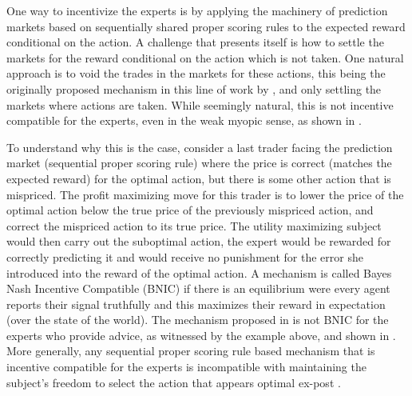 One way to incentivize the experts is by applying the machinery of prediction markets based on sequentially shared proper scoring rules to the expected reward conditional on the action.
A challenge that presents itself is how to settle the markets for the reward conditional on the action which is not taken.
One natural approach is to void the trades in the markets for these actions, this being the originally proposed mechanism in this line of work by \citet{hanson2002decision}, and only settling the markets where actions are taken.
While seemingly natural, this is not incentive compatible for the experts, even in the weak myopic sense, as shown in \citet{othman2010decision}. 

To understand why this is the case, consider a last trader facing the prediction market (sequential proper scoring rule)  where the  price is correct (matches the expected reward) for the optimal action, but there is some other action that is mispriced. The profit maximizing move for this trader is to lower the price of the optimal action below the true price of the previously mispriced action, and correct the mispriced action to its true  price. 
The utility maximizing subject would then carry out the suboptimal action, the expert would be rewarded for correctly predicting it and would receive no punishment for the error she introduced into the reward of the optimal action. 
A mechanism is called Bayes Nash Incentive Compatible (BNIC) if there is an equilibrium were every agent reports their signal truthfully and this maximizes their reward in expectation (over the state of the world).
The mechanism proposed in \citet{hanson2002decision} is not BNIC for the experts who provide advice, as witnessed by the example above, and shown in \citet{othman2010decision,chen2014eliciting}.
More generally, any sequential proper scoring rule based mechanism that is incentive compatible for the experts is incompatible with maintaining the subject's freedom to select the action that appears optimal ex-post \citep{ chen2014eliciting}. 



